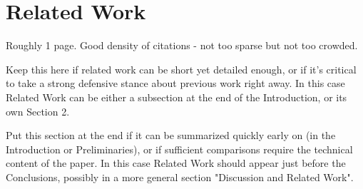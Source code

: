\section{Related Work}
\label{related}

Roughly 1 page. Good density of citations \cite{alex1994example} - not too sparse but not too crowded.

Keep this here if related work can be short yet detailed enough, or if it's critical to take a strong defensive stance about previous work right away. In this case Related Work can be either a subsection at the end of the Introduction, or its own Section 2.

Put this section at the end if it can be summarized quickly early on (in the Introduction or Preliminaries), or if sufficient comparisons require the technical content of the paper. In this case Related Work should appear just before the Conclusions, possibly in a more general section "Discussion and Related Work".